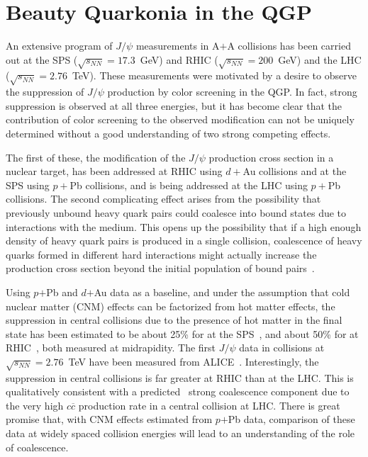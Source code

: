 
\section{Beauty Quarkonia in the QGP}
\label{sec:quarkonia_introduction}

An extensive program of $J/\psi$ measurements in A$+$A collisions has
been carried out at the SPS ($\sqrt{s_{NN}} = 17.3$~GeV) and RHIC
($\sqrt{s_{NN}} = 200$~GeV) and the LHC ($\sqrt{s_{NN}} =
2.76$~TeV). These measurements were motivated by a desire to observe
the suppression of $J/\psi$ production by color screening in the
QGP. In fact, strong suppression is observed at all three energies,
but it has become clear that the contribution of color screening to
the observed modification can not be uniquely determined without a
good understanding of two strong competing effects.

The first of these, the modification of the $J/\psi$ production cross
section in a nuclear target, has been addressed at RHIC using $d+$Au collisions and 
at the SPS using $p+$Pb collisions, and is being addressed at the LHC using $p+$Pb collisions.
The second complicating effect arises from
the possibility that previously unbound heavy quark pairs could
coalesce into bound states due to interactions with the medium.  This
opens up the possibility that if a high enough density of heavy quark
pairs is produced in a single collision, coalescence of heavy quarks
formed in different hard interactions might actually increase the
production cross section beyond the initial population of bound
pairs~\cite{Zhao:2011cv}.

Using $p$$+$Pb and $d$$+$Au data as a baseline, and under the
assumption that cold nuclear matter (CNM) effects can be factorized
from hot matter effects, the suppression in central collisions due to
the presence of hot matter in the final state has been estimated to be
about 25\% for \pbpb at the SPS~\cite{Arnaldi:2009ph}, and about 50\%
for \auau at RHIC~\cite{Brambilla:2010cs}, both measured at
midrapidity. 
The first $J/\psi$ data in \pbpb collisions at
$\sqrt{s_{NN}} = 2.76$~TeV have been measured from ALICE~\cite{Abelev:2012rv}.
Interestingly, the
suppression in central collisions is far greater at RHIC than at the
LHC. This is qualitatively consistent with a
predicted~\cite{Zhao:2011cv} strong coalescence component due to the
very high $c \overline{c}$ production rate in a central collision at LHC.
There is great promise that, with CNM effects estimated from
$p$$+$Pb data, comparison of these data at widely spaced collision
energies will lead to an understanding of the role of coalescence.

